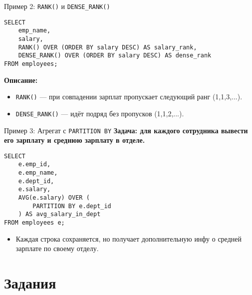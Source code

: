 \documentclass{beamer}
\begin{document}
\begin{frame}[fragile]{Пример 2: \texttt{RANK()} и \texttt{DENSE\_RANK()}}
	\begin{verbatim}
SELECT
    emp_name,
    salary,
    RANK() OVER (ORDER BY salary DESC) AS salary_rank,
    DENSE_RANK() OVER (ORDER BY salary DESC) AS dense_rank
FROM employees;
\end{verbatim}

	\textbf{Описание:}
	\begin{itemize}
		\item \texttt{RANK()} — при совпадении зарплат пропускает следующий ранг (1,1,3,...).
		\item \texttt{DENSE\_RANK()} — идёт подряд без пропусков (1,1,2,...).
	\end{itemize}
\end{frame}

\begin{frame}[fragile]{Пример 3: Агрегат с \texttt{PARTITION BY}}
	\textbf{Задача: для каждого сотрудника вывести его зарплату и среднюю зарплату в отделе.}
	\begin{verbatim}
SELECT
    e.emp_id,
    e.emp_name,
    e.dept_id,
    e.salary,
    AVG(e.salary) OVER (
        PARTITION BY e.dept_id
    ) AS avg_salary_in_dept
FROM employees e;
\end{verbatim}

	\begin{itemize}
		\item Каждая строка сохраняется, но получает дополнительную инфу о средней зарплате по своему отделу.
	\end{itemize}
\end{frame}

\section{Задания}
\end{document}
